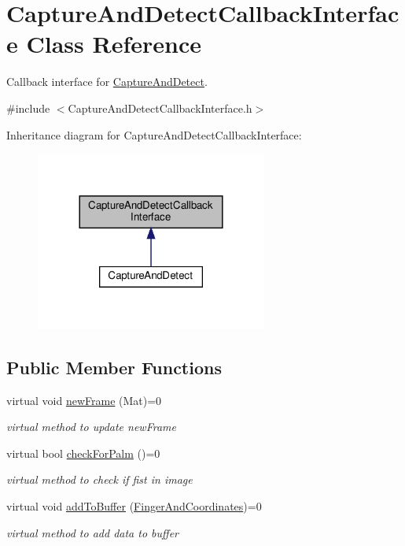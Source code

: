 \hypertarget{classCaptureAndDetectCallbackInterface}{}\section{Capture\+And\+Detect\+Callback\+Interface Class Reference}
\label{classCaptureAndDetectCallbackInterface}


Callback interface for \hyperlink{classCaptureAndDetect}{Capture\+And\+Detect}.  




{\ttfamily \#include $<$Capture\+And\+Detect\+Callback\+Interface.\+h$>$}



Inheritance diagram for Capture\+And\+Detect\+Callback\+Interface\+:\nopagebreak
\begin{figure}[H]
\begin{center}
\leavevmode
\includegraphics[width=216pt]{classCaptureAndDetectCallbackInterface__inherit__graph}
\end{center}
\end{figure}
\subsection*{Public Member Functions}
\begin{DoxyCompactItemize}
\item 
virtual void \hyperlink{classCaptureAndDetectCallbackInterface_ae833754fc1c2bb1450e958ef619e9153}{new\+Frame} (Mat)=0
\begin{DoxyCompactList}\small\item\em virtual method to update new\+Frame \end{DoxyCompactList}\item 
virtual bool \hyperlink{classCaptureAndDetectCallbackInterface_a64755838dd5592bae3ca06b4c5a0d72f}{check\+For\+Palm} ()=0
\begin{DoxyCompactList}\small\item\em virtual method to check if fist in image \end{DoxyCompactList}\item 
virtual void \hyperlink{classCaptureAndDetectCallbackInterface_a259dc71fd5d02424b91906d708e7de1f}{add\+To\+Buffer} (\hyperlink{classFingerAndCoordinates}{Finger\+And\+Coordinates})=0
\begin{DoxyCompactList}\small\item\em virtual method to add data to buffer \end{DoxyCompactList}\end{DoxyCompactItemize}


